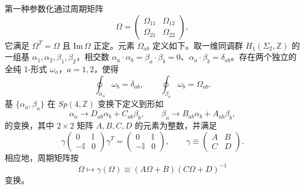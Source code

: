 第一种参数化通过周期矩阵
\begin{equation}
  \label{eq:5-34}
  \Omega = \begin{pmatrix}
    \Omega_{11} & \Omega_{12}\\
    \Omega_{21} & \Omega_{22}
  \end{pmatrix},
\end{equation}
它满足 $\Omega^T=\Omega$ 且 $\mathrm{Im}\,\Omega$ 正定。元素 $\Omega_{ab}$ 定义如下。取一维同调群 $H_1(\Sigma_2,\mathbb{Z})$ 的一组基 $\alpha_1,\alpha_2,\beta_1,\beta_2$，相交数 $\alpha_a\cdot\alpha_b=\beta_a\cdot\beta_b=0$、$\alpha_a\cdot\beta_b=\delta_{ab}$。存在两个独立的全纯 1-形式 $\omega_a$，$a=1,2$，使得
\begin{equation}
  \label{eq:5-35}
  \oint_{\alpha_a}\omega_b = \delta_{ab},
  \qquad
  \oint_{\beta_a}\omega_b = \Omega_{ab}.
\end{equation}
基 $\{\alpha_a,\beta_a\}$ 在 $Sp(4,\mathbb{Z})$ 变换下定义到形如
\begin{equation}
  \label{eq:5-36}
  \alpha_a \to D_{ab}\alpha_b + C_{ab}\beta_b,
  \qquad
  \beta_a \to B_{ab}\alpha_b + A_{ab}\beta_b,
\end{equation}
的变换，其中 $2\times2$ 矩阵 $A,B,C,D$ 的元素为整数，并满足
\begin{equation}
  \label{eq:5-37}
  \gamma
  \begin{pmatrix}
    0 & \mathbb{I}\\
    -\mathbb{I} & 0
  \end{pmatrix}
  \gamma^T
  =
  \begin{pmatrix}
    0 & \mathbb{I}\\
    -\mathbb{I} & 0
  \end{pmatrix},
  \qquad
  \gamma\equiv
  \begin{pmatrix}
    A & B\\
    C & D
  \end{pmatrix}.
\end{equation}
相应地，周期矩阵按
\begin{equation}
  \label{eq:5-38}
  \Omega \mapsto \gamma(\Omega)
  \equiv (A\Omega+B)(C\Omega+D)^{-1}
\end{equation}
变换。



